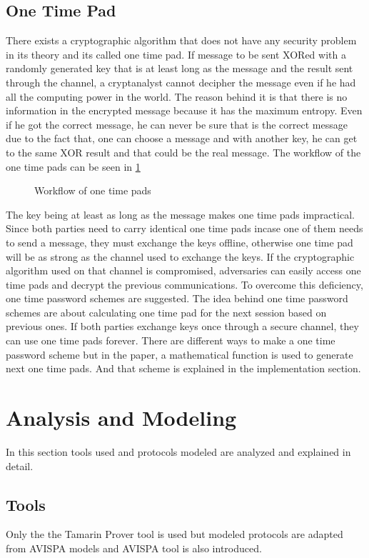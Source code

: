 \documentclass[a4paper, 12pt, titlepage]{article}
\begin{document}
\subsection{One Time Pad}
There exists a cryptographic algorithm that does not have any security problem in its theory and its called one time pad. If message to be sent XORed with a randomly generated key that is at least long as the message and the result sent through the channel, a cryptanalyst cannot decipher the message even if he had all the computing power in the world. The reason behind it is that there is no information in the encrypted message because it has the maximum entropy. Even if he got the correct message, he can never be sure that is the correct message due to the fact that, one can choose a message and with another key, he can get to the same XOR result and that could be the real message. The workflow of the one time pads can be seen in \ref{fig:otpwork}
\begin{figure}[H]
    \centering
    
    \caption{Workflow of one time pads \cite{otpworkk} }
    \label{fig:otpwork}
\end{figure}
The key being at least as long as the message makes one time pads impractical. Since both parties need to carry identical one time pads incase one of them needs to send a message, they must exchange the keys offline, otherwise one time pad will be as strong as the channel used to exchange the keys. If the cryptographic algorithm used on that channel is compromised, adversaries can easily access one time pads and decrypt the previous communications. To overcome this deficiency, one time password schemes are suggested. The idea behind one time password schemes are about calculating one time pad for the next session based on previous ones. If both parties exchange keys once through a secure channel, they can use one time pads forever. There are different ways to make a one time password scheme but in the paper\cite{otparticle}, a mathematical function is used to generate next one time pads. And that scheme is explained in the implementation section.
\newpage
\section{Analysis and Modeling}
In this section tools used and protocols modeled are analyzed and explained in detail.
\subsection{Tools}
Only the the Tamarin Prover tool is used but modeled protocols are adapted from AVISPA models and AVISPA tool is also introduced.
\end{document}
